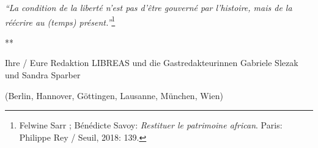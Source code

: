 \documentclass[a4paper,
fontsize=11pt,
oneside,
numbers=noperiodatend,
parskip=half-,
bibliography=totoc,
final
]{scrartcl}
\begin{document}
\emph{\enquote{La condition de la liberté n'est pas d'être gouverné par
l'histoire, mais de la réécrire au (temps) présent.}}\footnote{Felwine
  Sarr ; Bénédicte Savoy: \emph{Restituer le patrimoine african}. Paris:
  Philippe Rey / Seuil, 2018: 139.}

{\par \centering ***\par}

Ihre / Eure Redaktion LIBREAS und die Gastredakteurinnen Gabriele
Slezak und Sandra Sparber

(Berlin, Hannover, Göttingen, Lausanne, München, Wien)

\end{document}
